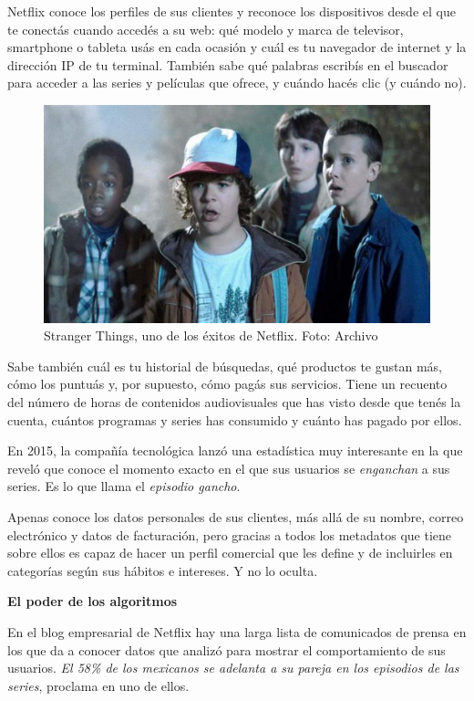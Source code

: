 \documentclass[a4paper,10pt,twoside,final,spanish]{article}
\begin{document}
Netflix conoce los perfiles de sus clientes y reconoce los dispositivos desde el que te conectás cuando accedés a su web: qué modelo y marca de televisor, smartphone o tableta usás en cada ocasión y cuál es tu navegador de internet y la dirección IP de tu terminal. También sabe qué palabras escribís en el buscador para acceder a las series y películas que ofrece, y cuándo hacés clic (y cuándo no).
 
\begin{figure}[!htbp]
\centerline{\includegraphics{img2}}
\caption{Stranger Things, uno de los éxitos de Netflix. Foto: Archivo}
\label{fig:img2}
\end{figure}
 
Sabe también cuál es tu historial de búsquedas, qué productos te gustan más, cómo los puntuás y, por supuesto, cómo pagás sus servicios. Tiene un recuento del número de horas de contenidos audiovisuales que has visto desde que tenés la cuenta, cuántos programas y series has consumido y cuánto has pagado por ellos.

En 2015, la compañía tecnológica lanzó una estadística muy interesante en la que reveló que conoce el momento exacto en el que sus usuarios se \textit{enganchan} a sus series. Es lo que llama el \textit{episodio gancho}.

Apenas conoce los datos personales de sus clientes, más allá de su nombre, correo electrónico y datos de facturación, pero gracias a todos los metadatos que tiene sobre ellos es capaz de hacer un perfil comercial que les define y de incluirles en categorías según sus hábitos e intereses. Y no lo oculta.

\textbf{El poder de los algoritmos}
 
En el blog empresarial de Netflix hay una larga lista de comunicados de prensa en los que da a conocer datos que analizó para mostrar el comportamiento de sus usuarios. \textit{El 58\% de los mexicanos se adelanta a su pareja en los episodios de las series}, proclama en uno de ellos.
\end{document}
